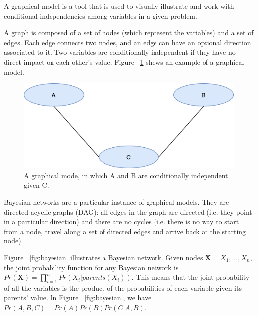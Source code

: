 \begin{definition}
	A graphical model is a tool that is used to visually illustrate and work with conditional independencies among variables in a given problem.
\end{definition}

A graph is composed of a set of nodes (which represent the variables) and a set of edges. Each edge connects two nodes, and an edge can have an optional direction associated to it. Two variables are conditionally independent if they have no direct impact on each other's value. Figure ~\ref{fig:graph_model} shows an example of a graphical model.

\begin{figure}[h!]
	\center
	\includegraphics[scale=0.63]{images/synthetic/graphical_model.png}
	\caption{\label{fig:graph_model} A graphical mode,  in which A and B are conditionally independent given C.}
\end{figure}

\begin{definition}
	Bayesian networks are a particular instance of graphical models. They are directed acyclic graphs (DAG): all edges in the graph are directed (i.e. they point in a particular direction) and there are no cycles (i.e. there is no way to start from a node, travel along a set of directed edges and arrive back at the starting node).
\end{definition}

Figure ~\ref{fig:bayesian} illustrates a Bayesian network. Given nodes $\textbf{X} = X_1, \dots, X_n$, the joint probability function for any Bayesian network is $Pr(\textbf{X}) = \prod_{i=1}^nPr(X_i | parents(X_i))$. This means that the joint probability of all the variables is the product of the probabilities of each variable given its parents' value. In Figure ~\ref{fig:bayesian}, we have $Pr(A,B,C) = Pr(A)Pr(B)Pr(C|A,B)$.

